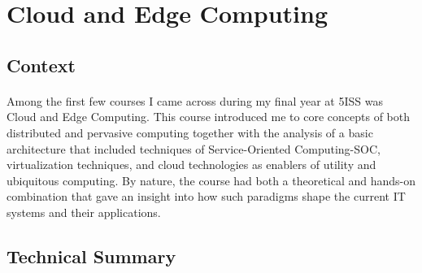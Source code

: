 \section{Cloud and Edge Computing}
\subsection{Context}
\paragraph{}Among the first few courses I came across during my final year at 5ISS was Cloud and Edge Computing. This course introduced me to core concepts of both distributed and pervasive computing together with the analysis of a basic architecture that included techniques of Service-Oriented Computing-SOC, virtualization techniques, and cloud technologies as enablers of utility and ubiquitous computing. By nature, the course had both a theoretical and hands-on combination that gave an insight into how such paradigms shape the current IT systems and their applications.

\subsection{Technical Summary} %

